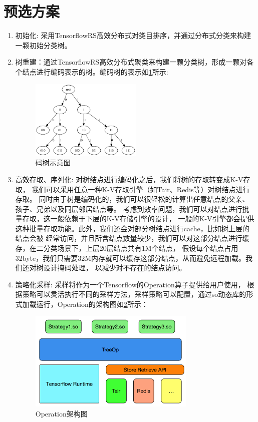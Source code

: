 \documentclass[10pt]{article}
\begin{document}
\section{预选方案}
\begin{enumerate}
\item 初始化: 采用TensorflowRS高效分布式对类目排序，并通过分布式分类来构建一颗初始分类树。
\item 树重建：通过TensorflowRS高效分布式聚类来构建一颗分类树，形成一颗对各个结点进行编码表示的树。编码树的表示如\ref{fig:tree}所示:
  \begin{figure}[!htbp]
    \centering   %
    \includegraphics[width=0.5\textwidth]{./tree.png}
    \caption{码树示意图}
    \label{fig:tree}
  \end{figure}

\item 高效存取、序列化: 对树结点进行编码化之后，我们将树的存取转变成K-V存取，
  我们可以采用任意一种K-V存取引擎（如Tair、Redis等）对树结点进行存取。
  同时由于树是编码化的，我们可以很轻松的计算出任意结点的父亲、孩子、兄弟以及同层邻居结点等。
  考虑到效率问题，我们可以对结点进行批量存取，这一般依赖于下层的K-V存储引擎的设计，
  一般的K-V引擎都会提供这种批量存取功能。此外，我们还会对部分树结点进行cache，比如树上层的结点会被
  经常访问，并且所含结点数量较少，我们可以对这部分结点进行缓存，在二分类场景下，上层20层结点共有1M个结点，
  假设每个结点占用32byte，我们只需要32M内存就可以缓存这部分结点，从而避免远程加载。我们还对树设计掩码处理，
  以减少对不存在的结点访问。

\item 策略化采样: 采样将作为一个Tensorflow的Operation算子提供给用户使用，
  根据策略可以灵活执行不同的采样方法，采样策略可以配置，通过so动态库的形式加载运行，Operation的架构图如\ref{fig:op_arc}所示：
  \begin{figure}[!htbp]
    \centering   %
    \includegraphics[width=0.75\textwidth]{./op_arc.png}
    \caption{Operation架构图}
    \label{fig:op_arc}
  \end{figure}


\end{enumerate}
\end{document}
